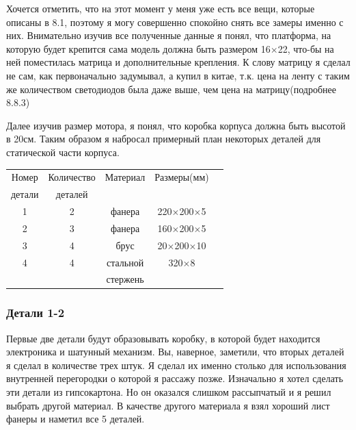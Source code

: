 \documentclass[a4paper, 12pt]{article}
\begin{document}
Хочется отметить, что на этот момент у меня уже есть все вещи, которые описаны
в 8.1, поэтому я могу совершенно спокойно снять все замеры именно с них.
Внимательно изучив все полученные данные я понял, что платформа, на которую
будет крепится сама модель должна быть размером 16$\times$22, что-бы на ней
поместилась матрица и дополнительные крепления. К слову матрицу я сделал не
сам, как первоначально задумывал, а купил в китае, т.к. цена на ленту с таким
же количеством светодиодов была даже выше, чем цена на матрицу(подробнее 8.8.3)

Далее изучив размер мотора, я понял, что коробка корпуса должна быть высотой в
20см. Таким образом я набросал примерный план некоторых деталей для статической
части корпуса.
\\
\begin{center}
  \begin{tabular}{ |c|c|c|c|c|}
    \hline
    Номер  & Количество & Материал & Размеры(мм)             \\
    детали & деталей    &          &                         \\
    \hline
    1      & 2          & фанера   & 220$\times$200$\times$5 \\
    \hline
    2      & 3          & фанера   & 160$\times$200$\times$5 \\
    \hline
    3      & 4          & брус     & 20$\times$200$\times$10 \\
    \hline
    4      & 4          & стальной & 320$\times$8            \\
           &            & стержень &                         \\
    \hline
  \end{tabular}
\end{center}

\newpage
\subsubsection{Детали 1-2}

Первые две детали будут образовывать коробку, в которой будет находится
электроника и шатунный механизм. Вы, наверное, заметили, что вторых деталей
я сделал в количестве трех штук. Я сделал их именно столько для использования
внутренней перегородки о которой я рассажу позже. Изначально я хотел сделать
эти детали из гипсокартона. Но он оказался слишком рассыпчатый и я решил
выбрать другой материал. В качестве другого материала я взял хороший лист
фанеры и наметил все 5 деталей.
\end{document}
